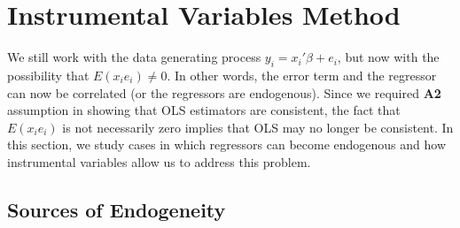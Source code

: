 \documentclass[12pt]{article}
\theoremstyle{definition}
\theoremstyle{property}
\theoremstyle{assumption}
\theoremstyle{example}
\theoremstyle{comment}
\begin{document}
\section{Instrumental Variables Method}
We still work with the data generating process $y_i = x_i'\beta+e_i$, but now with the possibility that $E(x_ie_i)\neq0$. In other words, the error term and the regressor can now be correlated (or the regressors are endogenous). Since we required \textbf{A2} assumption in showing that OLS estimators are consistent, the fact that $E(x_ie_i)$ is not necessarily zero implies that OLS may no longer be consistent. In this section, we study cases in which regressors can become endogenous and how instrumental variables allow us to address this problem. 
\subsection{Sources of Endogeneity}
\end{document}
